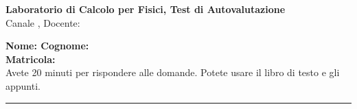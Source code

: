 \documentclass[9pt]{article}
\begin{document}
\pagestyle{empty}

\begin{center}
{\Large \bf  Laboratorio di Calcolo per Fisici, Test di Autovalutazione\\[2mm]}
{\large Canale \canale, Docente: \docente}
\end{center}
\vspace{4mm}
\begin{mdframed}[backgroundcolor=panna]
{\bf Nome: \qquad \qquad \qquad\qquad \qquad \qquad Cognome:}\\
\newline
{\bf Matricola:}\\
Avete 20 minuti per rispondere alle domande. Potete usare il libro di testo e gli appunti.
\end{mdframed}
%
%

\hrule
\vspace{2mm}
\end{document}

